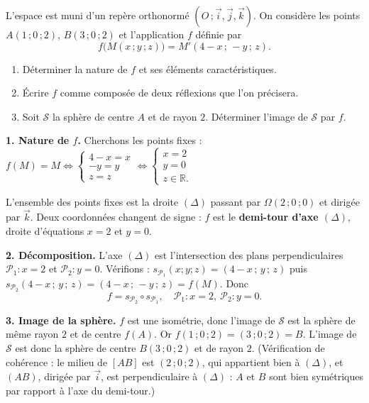 \documentclass[11pt]{article}
\begin{document}
\begin{exoresolu}
L'espace est muni d'un repère orthonormé $(O\,;\vec{i},\vec{j},\vec{k})$. On considère les points $A(1\,;0\,;2)$, $B(3\,;0\,;2)$ et l'application $f$ définie par
\[
f\big(M(x\,;y\,;z)\big) = M'(4 - x\,;\,-y\,;\,z).
\]
\begin{enumerate}
\item Déterminer la nature de $f$ et ses éléments caractéristiques.
\item Écrire $f$ comme composée de deux réflexions que l'on précisera.
\item Soit $\mathcal{S}$ la sphère de centre $A$ et de rayon $2$. Déterminer l'image de $\mathcal{S}$ par $f$.
\end{enumerate}
\tcblower
\textbf{1. Nature de $f$.} Cherchons les points fixes : $f(M) = M \iff \begin{cases} 4 - x = x \\ -y = y \\ z = z \end{cases} \iff \begin{cases} x = 2 \\ y = 0 \\ z \in \mathbb{R}. \end{cases}$

L'ensemble des points fixes est la droite $(\Delta)$ passant par $\Omega(2\,;0\,;0)$ et dirigée par $\vec{k}$. Deux coordonnées changent de signe : $f$ est le \textbf{demi-tour d'axe $(\Delta)$}, droite d'équations $x = 2$ et $y = 0$.

\textbf{2. Décomposition.} L'axe $(\Delta)$ est l'intersection des plans perpendiculaires $\mathcal{P}_1 : x = 2$ et $\mathcal{P}_2 : y = 0$. Vérifions : $s_{\mathcal{P}_1}(x;y;z) = (4 - x\,;\,y\,;\,z)$ puis $s_{\mathcal{P}_2}(4 - x\,;\,y\,;\,z) = (4 - x\,;\,-y\,;\,z) = f(M)$. Donc
\[
f = s_{\mathcal{P}_2} \circ s_{\mathcal{P}_1}, \quad \mathcal{P}_1 : x = 2, \ \mathcal{P}_2 : y = 0.
\]

\textbf{3. Image de la sphère.} $f$ est une isométrie, donc l'image de $\mathcal{S}$ est la sphère de même rayon $2$ et de centre $f(A)$. Or $f(1\,;0\,;2) = (3\,;0\,;2) = B$. L'image de $\mathcal{S}$ est donc la sphère de centre $B(3\,;0\,;2)$ et de rayon $2$. (Vérification de cohérence : le milieu de $[AB]$ est $(2\,;0\,;2)$, qui appartient bien à $(\Delta)$, et $(AB)$, dirigée par $\vec{i}$, est perpendiculaire à $(\Delta)$ : $A$ et $B$ sont bien symétriques par rapport à l'axe du demi-tour.)
\end{exoresolu}
\end{document}
